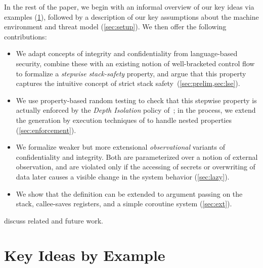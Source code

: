 \documentclass[acmsmall,review,anonymous]{acmart}\settopmatter{printfolios=true,printccs=false,printacmref=false}
\begin{document}
In the rest of the paper, we begin with an informal overview of our key ideas via
examples (\cref{sec:running-example}), followed by a description of our key
assumptions about the machine environment and threat model (\cref{sec:setup}).
We then offer the following contributions:

\begin{itemize}
\item We adapt concepts of integrity and confidentiality from language-based
security, combine these with an existing notion of well-bracketed
control flow to formalize a {\em stepwise stack-safety}
property, and argue that this property captures the intuitive concept of
strict stack
safety~(\cref{sec:prelim,sec:lse}).
\item We use property-based random testing to check that this stepwise
property is actually enforced by the {\em Depth Isolation} policy
of~\citet{DBLP:conf/sp/RoesslerD18}; in the process, we extend the generation by
execution techniques of \citet{TestingNI:ICFP} to handle nested
properties (\cref{sec:enforcement}).
\item We formalize weaker but more extensional \emph{observational} variants of
  confidentiality and integrity. Both are parameterized over a notion of external
  observation, and are violated only if the accessing of secrets or overwriting of
  data later causes a visible change in the system behavior (\cref{sec:lazy}).
\item We show that the definition can be
extended to argument passing on the stack, callee-saves registers, and a simple coroutine system (\cref{sec:ext}).
\end{itemize}
 discuss related and future work.

\section{Key Ideas by Example}
\label{sec:running-example}

\newcommand{\mainsealc}{cyan}
\newcommand{\fsealc}{green}
\newcommand{\unsealc}{lgray}
\newcommand{\emptyoutc}{white} %
\newcommand{\fulloutc}{white}
\newcommand{\badc}{lred}
\newcommand{\goodc}{lblue}
\newcommand{\retptrc}{black}
\newcommand{\sealdesc}[1]{Seal(#1)}
\newcommand{\unsealdesc}{Unseal}
\newcommand{\retptrdesc}{RetPtr}
\newcommand{\passdesc}[2]{Pass(#1,#2)}
\end{document}
